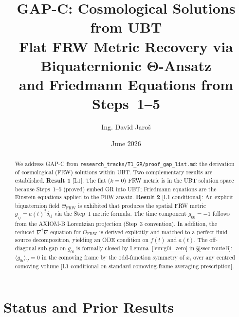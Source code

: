 \documentclass[12pt,a4paper]{article}
\title{\textbf{GAP-C: Cosmological Solutions from UBT}\\
       \large Flat FRW Metric Recovery via Biquaternionic Θ-Ansatz\\
       and Friedmann Equations from Steps~1--5}
\author{Ing. David Jaroš}
\date{June 2026}
\theoremstyle{definition}
\theoremstyle{remark}
\begin{document}
\maketitle

\begin{abstract}
We address GAP-C from \texttt{research\_tracks/T1\_GR/proof\_gap\_list.md}:
the derivation of cosmological (FRW) solutions within UBT.
Two complementary results are established.
\textbf{Result 1} [L1]: The flat ($k=0$) FRW metric is in the UBT solution space
because Steps~1--5 (proved) embed GR into UBT; Friedmann equations are the
Einstein equations applied to the FRW ansatz.
\textbf{Result 2} [L1 conditional]: An explicit biquaternion field
$\Theta_{\mathrm{FRW}}$ is exhibited that produces the spatial FRW metric
$g_{ij} = a(t)^2\delta_{ij}$ via the Step~1 metric formula.
The time component $g_{00} = -1$ follows from the AXIOM-B Lorentzian projection
(Step~3 convention).
In addition, the reduced $\nabla^\dagger\nabla$ equation for $\Theta_{\mathrm{FRW}}$
is derived explicitly and matched to a perfect-fluid source decomposition,
yielding an ODE condition on $f(t)$ and $a(t)$.
The off-diagonal sub-gap on $g_{0i}$ is formally closed
by Lemma~\ref{lem:g0i_zero} in §\ref{ssec:routeB}:
$\langle g_{0i}\rangle_{\mathcal{V}} = 0$ in the comoving frame by the
odd-function symmetry of $x_i$ over any centred comoving volume
[L1 conditional on standard comoving-frame averaging prescription].
\end{abstract}
\fi

\section{Status and Prior Results}
\label{sec:status}
\end{document}
